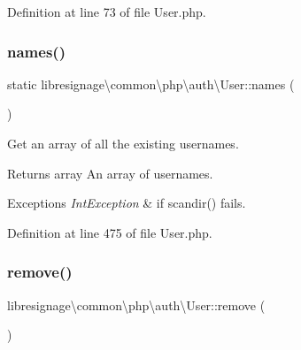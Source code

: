 Definition at line 73 of file User.\+php.

\mbox{\label{classlibresignage_1_1common_1_1php_1_1auth_1_1User_ade3e97db7135ba04fa33c4e3aa763d74}} 
\subsubsection{\texorpdfstring{names()}{names()}}
{\footnotesize\ttfamily static libresignage\textbackslash{}common\textbackslash{}php\textbackslash{}auth\textbackslash{}\+User\+::names (\begin{DoxyParamCaption}{ }\end{DoxyParamCaption})\hspace{0.3cm}{\ttfamily [static]}}

Get an array of all the existing usernames.

\begin{DoxyReturn}{Returns}
array An array of usernames.
\end{DoxyReturn}

\begin{DoxyExceptions}{Exceptions}
{\em Int\+Exception} & if scandir() fails. \\
\hline
\end{DoxyExceptions}


Definition at line 475 of file User.\+php.

\mbox{\label{classlibresignage_1_1common_1_1php_1_1auth_1_1User_a2119c5c129dc4e88b887e111b0b8566d}} 
\subsubsection{\texorpdfstring{remove()}{remove()}}
{\footnotesize\ttfamily libresignage\textbackslash{}common\textbackslash{}php\textbackslash{}auth\textbackslash{}\+User\+::remove (\begin{DoxyParamCaption}{ }\end{DoxyParamCaption})}

